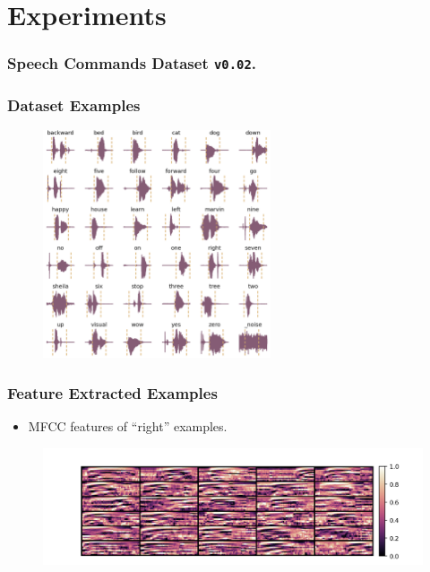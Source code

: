 
\section{Experiments}

\begin{frame}
  \frametitle{Speech Commands Dataset \texttt{v0.02}.}
  
\end{frame}

\begin{frame}
  \frametitle{Dataset Examples}
  \vspace{-0.75cm}
  \begin{figure}[!ht]
    \centering
      \includegraphics[width=0.60\textwidth]{../5_exp/figs/exp_dataset_speech_cmd_wav_grid.png}
  \end{figure}
\end{frame}

\begin{frame}
  \frametitle{Feature Extracted Examples}
  \vspace{-0.75cm}
  \begin{itemize}
    \item MFCC features of \enquote{right} examples.
  \end{itemize}
  \begin{figure}[!ht]
    \centering
    \includegraphics[width=1.0\textwidth]{../5_exp/figs/exp_dataset_speech_cmd_mfcc_right.png}
  \end{figure}
\end{frame}

